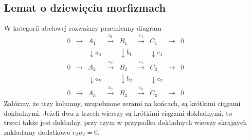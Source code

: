\subsection{Lemat o dziewięciu morfizmach}
\begin{twierdzenie}\label{cat:thm:nine-lemma}
W kategorii abelowej rozważmy przemienny diagram
\[
\begin{array}{ccccccccc}
0&\to&A_1&\xrightarrow{u_1}&B_1&\xrightarrow{v_1}&C_1&\to&0\\
&&\downarrow a_1&&\downarrow b_1&&\downarrow c_1\\
0&\to&A_2&\xrightarrow{u_2}&B_2&\xrightarrow{v_2}&C_2&\to&0\\
&&\downarrow a_2&&\downarrow b_2&&\downarrow c_2\\
0&\to&A_3&\xrightarrow{u_3}&B_3&\xrightarrow{v_3}&C_3&\to&0 .
\end{array}
\]
Załóżmy, że trzy kolumny, uzupełnione zerami na końcach, są krótkimi ciągami dokładnymi. Jeżeli dwa z trzech wierszy są krótkimi ciągami dokładnymi, to trzeci także jest dokładny, przy czym w przypadku dokładnych wierszy skrajnych zakładamy dodatkowo $v_2u_2=0$.
\end{twierdzenie}
